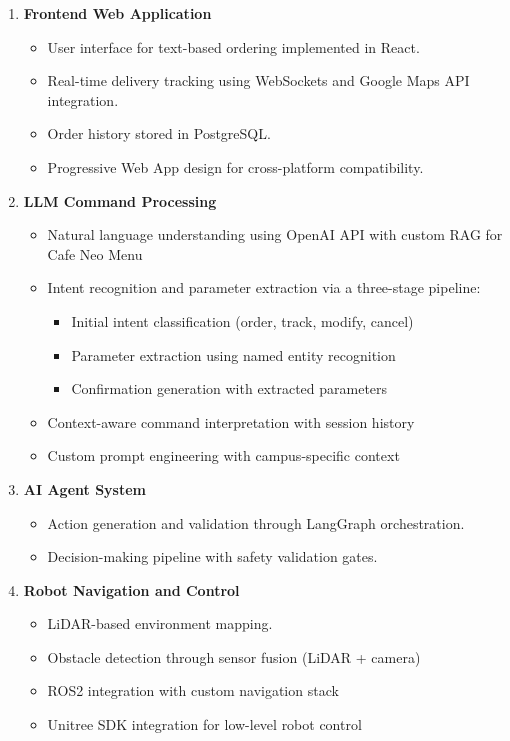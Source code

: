 \documentclass[12pt]{article}
\begin{document}
\begin{enumerate}
    \item \textbf{Frontend Web Application}
    \begin{itemize}
        \item User interface for text-based ordering implemented in React.
        \item Real-time delivery tracking using WebSockets and Google Maps API integration.
        \item Order history stored in PostgreSQL.
        \item Progressive Web App design for cross-platform compatibility.
    \end{itemize}
    
    \item \textbf{LLM Command Processing}
    \begin{itemize}
        \item Natural language understanding using OpenAI API with custom RAG for Cafe Neo Menu
        \item Intent recognition and parameter extraction via a three-stage pipeline:
        \begin{itemize}
            \item Initial intent classification (order, track, modify, cancel)
            \item Parameter extraction using named entity recognition
            \item Confirmation generation with extracted parameters
        \end{itemize}
        \item Context-aware command interpretation with session history
        \item Custom prompt engineering with campus-specific context
    \end{itemize}
    
    \item \textbf{AI Agent System}
    \begin{itemize}
        \item Action generation and validation through LangGraph orchestration.
        \item Decision-making pipeline with safety validation gates.
    \end{itemize}
    
    \item \textbf{Robot Navigation and Control}
    \begin{itemize}
        \item LiDAR-based environment mapping.
        \item Obstacle detection through sensor fusion (LiDAR + camera)
        \item ROS2 integration with custom navigation stack
        \item Unitree SDK integration for low-level robot control
    \end{itemize}
\end{enumerate}
\end{document}
